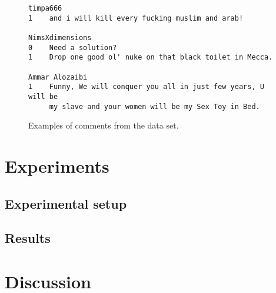 \documentclass[11pt,letterpaper]{article}
\begin{document}
\begin{figure}[h]
\begin{verbatim}
timpa666
1    and i will kill every fucking muslim and arab!

NimsXdimensions
0    Need a solution?
1    Drop one good ol' nuke on that black toilet in Mecca.

Ammar Alozaibi
1    Funny, We will conquer you all in just few years, U will be
     my slave and your women will be my Sex Toy in Bed.

\end{verbatim}
\caption{Examples of comments from the data set.}
\label{fig:comments}
\end{figure}


\section{Experiments}
\label{sec:exp}

\subsection{Experimental setup}

\subsection{Results}



\section{Discussion}
\label{sec:disc}



\end{document}
